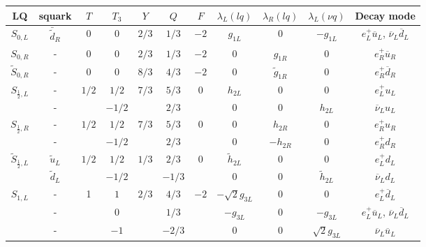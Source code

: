 \begin{table}
  \centering
  \renewcommand{\arraystretch}{1.5}
  \begin{tabular}{cc|cc|c|c|c|ccc|c}
    LQ & squark & $T$ &  $T_{3}$ & $Y$ & $Q$     & $F$ & $\lambda_{L} (lq)$ & $\lambda_{R} (lq)$& $\lambda_{L} (\nu q)$  & Decay mode \\
    \hline\hline    
    $S_{0,L}$ & ${\bar{\tilde d}}_{R}$  & $0$ & $0$     & $2/3$ & $1/3$  & $-2$ & $g_{1L}$ & 0 & $-g_{1L}$ & $e_{L}^{+}\overline{u}_{L}$, $\overline{\nu}_{L}\overline{d}_{L}$ \\
    \hline
    $S_{0,R}$ & - & $0$ & $0$     & $2/3$ & $1/3$  & $-2$ & 0 & $g_{1R}$ & 0 & $e_{R}^{+}\overline{u}_{R}$                \\
    \hline
    $\tilde{S}_{0,R}$ & - & $0$ & $0$ & $8/3$ & $4/3$ & $-2$ & 0 & ${\tilde g}_{1R}$ & 0 & $e_{R}^{+}\overline{d}_{R}$           \\
    \hline
    \multirow{2}{*}{$S_{\frac{1}{2},L}$} & - & \multirow{2}{*}{$1/2$} 
    & $1/2$ & \multirow{2}{*}{$7/3$} & $5/3$ & \multirow{2}{*}{0} & $h_{2L}$ &0 & 0 & $e_{L}^{+} u_{L}$     \\
    & - & & $-1/2$  & & $2/3$ & & 0  & 0 & $h_{2L}$ & $\overline{\nu}_{L}u_{L}$   \\
    \hline
    \multirow{2}{*}{$S_{\frac{1}{2},R}$} & - & \multirow{2}{*}{$1/2$}
    & $1/2$ & \multirow{2}{*}{$7/3$} & $5/3$ & \multirow{2}{*}{$0$} & 0 & $h_{2R}$ & 0 & $e_{R}^{+}u_{R}$     \\
    & - & & $-1/2$  & & $2/3$ & & 0 & $-h_{2R}$ & 0 & $e_{R}^{+}d_{R}$     \\
    \hline
    \multirow{2}{*}{$\tilde{S}_{\frac{1}{2},L}$} & ${\tilde u}_{L}$ & \multirow{2}{*}{$1/2$} 
    & $1/2$ & \multirow{2}{*}{$1/3$} & $2/3$ & \multirow{2}{*}{$0$} & ${\tilde h}_{2L}$ & 0 & 0 & $e_{L}^{+}d_{L}$     \\
    & ${\tilde d}_{L}$ & & $-1/2$  & & $-1/3$ & &0 & 0 &${\tilde h}_{2L}$ & $\overline{\nu}_{L}d_{L}$   \\
    \hline
    \multirow{3}{*}{$S_{1,L}$} & - & \multirow{3}{*}{1}
    & $1$   & \multirow{3}{*}{$2/3$} & $4/3$ & \multirow{3}{*}{$-2$} &$-\sqrt{2}g_{3L}$ &0 &0 & $e_{L}^{+}\overline{d}_{L}$  \\
    & - & & $0$    & & $1/3$ &  & $-g_{3L}$ & 0 & $-g_{3L}$ & $e_{L}^{+}\overline{u}_{L}$, $\overline{\nu}_{L}\overline{d}_{L}$ \\
    & - & & $-1$    & & $-2/3$  &  & 0 & 0 & $\sqrt{2}g_{3L}$ & $\overline{\nu}_{L}\overline{u}_{L}$              \\

\end{tabular}
\end{table}
